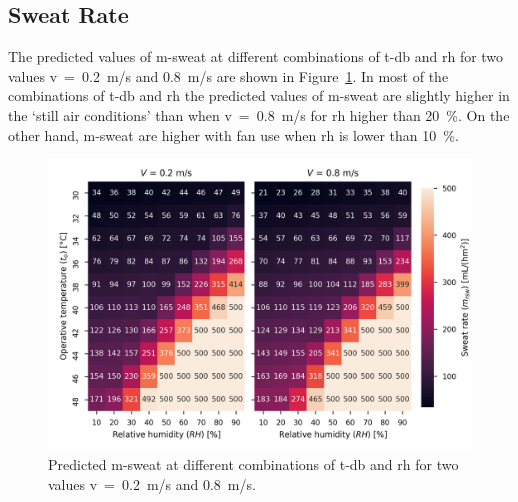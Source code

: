 \subsection{Sweat Rate}\label{subsec:sweat-rate}

The predicted values of \ac{m-sweat} at different combinations of \ac{t-db} and \ac{rh} for two values \acf{v}~=~0.2~m/s and 0.8~m/s are shown in Figure~\ref{fig:sweat_rate}.
In most of the combinations of \acf{t-db} and \acf{rh} the predicted values of \ac{m-sweat} are slightly higher in the `still air conditions' than when \ac{v}~=~0.8~m/s for \ac{rh} higher than 20~\%.
On the other hand, \ac{m-sweat} are higher with fan use when \ac{rh} is lower than 10~\%.


\begin{figure}[thb!]
    \centering
    \includegraphics[width=\textwidth]{figures/sweat_rate}
    \caption{Predicted \acf{m-sweat} at different combinations of \acf{t-db} and \acf{rh} for two values \acf{v}~=~0.2~m/s and 0.8~m/s.}
    \label{fig:sweat_rate}
\end{figure}
